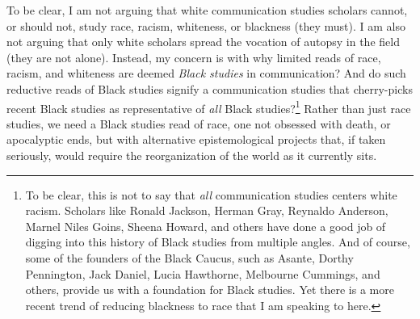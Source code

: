 \documentclass{tufte-handout}
\begin{document}
To be clear, I am not arguing that white communication studies scholars
cannot, or should not, study race, racism, whiteness, or blackness (they
must). I am also not arguing that only white scholars spread the
vocation of autopsy in the field (they are not alone). Instead, my
concern is with why limited reads of race, racism, and whiteness are
deemed \emph{Black studies} in communication? And do such reductive
reads of Black studies signify a communication studies that cherry-picks
recent Black studies as representative of \emph{all} Black
studies?\footnote{To be clear, this is not to say that \emph{all} communication studies
  centers white racism. Scholars like Ronald Jackson, Herman Gray,
  Reynaldo Anderson, Marnel Niles Goins, Sheena Howard, and others have
  done a good job of digging into this history of Black studies from
  multiple angles. And of course, some of the founders of the Black
  Caucus, such as Asante, Dorthy Pennington, Jack Daniel, Lucia
  Hawthorne, Melbourne Cummings, and others, provide us with a
  foundation for Black studies. Yet there is a more recent trend of
  reducing blackness to race that I am speaking to here.
} Rather than just race
studies, we need a Black studies read of race, one not obsessed with
death, or apocalyptic ends, but with alternative epistemological
projects that, if taken seriously, would require the reorganization of
the world as it currently sits.
\end{document}
